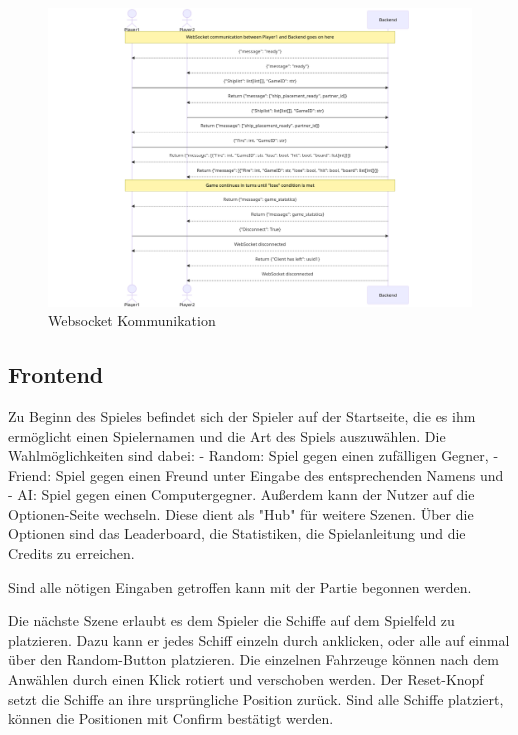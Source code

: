 \documentclass[a4paper, 10pt, conference]{IEEEtran}
\begin{document}
\begin{figure}[thp]
    \centering
    \includegraphics[width=\linewidth]{websocket_comm}
    \caption{Websocket Kommunikation}
    \label{fig:websocket_comm}
\end{figure}

\subsection{Frontend}\label{subsec:frontend}

Zu Beginn des Spieles befindet sich der Spieler auf der Startseite, die es ihm ermöglicht einen Spielernamen und die Art des Spiels auszuwählen. Die Wahlmöglichkeiten sind dabei: 
- Random: Spiel gegen einen zufälligen Gegner, 
- Friend: Spiel gegen einen Freund unter Eingabe des entsprechenden Namens und 
- AI: Spiel gegen einen Computergegner. 
Außerdem kann der Nutzer auf die Optionen-Seite wechseln. Diese dient als "Hub" für weitere Szenen. Über die Optionen sind das Leaderboard, die Statistiken, die Spielanleitung und die Credits zu erreichen. 


Sind alle nötigen Eingaben getroffen kann mit der Partie begonnen werden.

Die nächste Szene erlaubt es dem Spieler die Schiffe auf dem Spielfeld zu platzieren. Dazu kann er jedes Schiff einzeln durch anklicken, oder alle auf einmal über den Random-Button platzieren. Die einzelnen Fahrzeuge können nach dem Anwählen durch einen Klick rotiert und verschoben werden. Der Reset-Knopf setzt die Schiffe an ihre ursprüngliche Position zurück. Sind alle Schiffe platziert, können die Positionen mit Confirm bestätigt werden.
\end{document}

